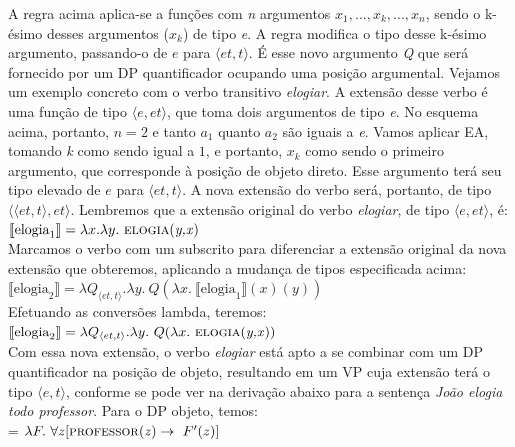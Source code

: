 \n A regra acima aplica-se a funções com \textit{n} argumentos $x_{1},...,x_{k},...,x_{n}$, sendo o k-ésimo desses argumentos ($x_{k}$) de tipo \textit{e}. A regra modifica o tipo desse k-ésimo argumento, passando-o de $e$ para $\langle et,t\rangle$. É esse novo argumento \textit{Q} que será fornecido por um DP quantificador ocupando uma posição argumental. Vejamos um exemplo concreto com o verbo transitivo \textit{elogiar}. A extensão desse verbo é uma função de tipo $\langle e,et\rangle$, que toma dois argumentos de tipo \textit{e}. No esquema acima, portanto, $n=2$ e tanto $a_{1}$ quanto $a_{2}$ são iguais a \textit{e}. Vamos aplicar EA, tomando \textit{k} como sendo igual a $1$, e portanto, $x_{k}$ como sendo o primeiro argumento, que corresponde à posição de objeto direto. Esse argumento terá seu tipo elevado de $e$ para $\langle et,t\rangle$. A nova extensão do verbo será, portanto, de tipo $\langle \langle et,t\rangle,et\rangle$. Lembremos que a extensão original do verbo \textit{elogiar}, de tipo $\langle e,et\rangle$, é:\\

\n $\llbracket \text{elogia}_{1} \rrbracket = \lambda x.\lambda y.\ \text{\textsc{elogia}(\textit{y,x})}$\\

\n Marcamos o verbo com um subscrito para diferenciar a extensão original da nova extensão que obteremos, aplicando a mudança de tipos especificada acima:\\

\n $\llbracket \text{elogia}_{2} \rrbracket = \lambda Q_{\langle et,t\rangle}.\lambda y.\
Q(\lambda x.\ \llbracket \text{elogia}_{1} \rrbracket (x)(y))$\\

\n Efetuando as conversões lambda, teremos:\\

\n $\llbracket \text{elogia}_{2} \rrbracket = \lambda Q_{\langle et,t\rangle}.\lambda y.\
Q(\lambda x.\ \text{\textsc{elogia}(\textit{y,x})})$\\

\n Com essa nova extensão, o verbo \textit{elogiar} está apto a se combinar com um DP quantificador na posição de objeto, resultando em um VP cuja extensão terá o tipo $\langle e,t\rangle$, conforme se pode ver na derivação abaixo para a sentença \textit{João elogia todo professor}. Para o DP objeto, temos:\\

\n \den{DP} = $\lambda F.\ \forall z [\text{\textsc{professor}(\textit{z})} \rightarrow\ F'(z)]$\\

